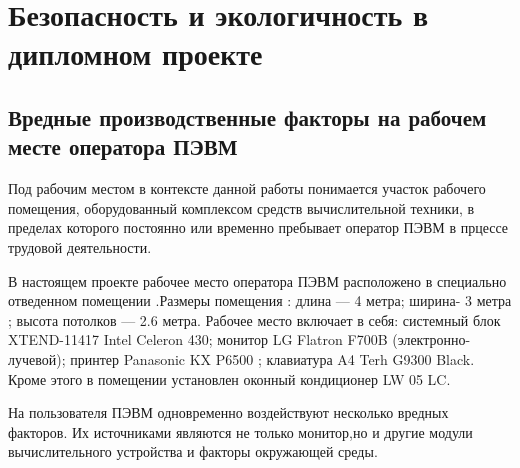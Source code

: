 \section{Безопасность и экологичность в дипломном проекте}

\subsection{Вредные производственные факторы на рабочем месте оператора ПЭВМ}
Под рабочим местом в контексте данной работы понимается участок рабочего
помещения, оборудованный комплексом средств вычислительной техники, в
пределах которого постоянно или временно пребывает оператор ПЭВМ в прцессе трудовой деятельности.


В настоящем проекте рабочее место оператора ПЭВМ расположено в 
специально отведенном помещении .Размеры помещения : длина — 4 метра;
ширина- 3 метра ; высота потолков — 2.6 метра. Рабочее место включает в себя:
системный блок XTEND-11417 Intel Celeron 430;  монитор LG Flatron F700B
(электронно-лучевой);  принтер  Panasonic KX P6500 ; клавиатура A4 Terh 
G9300 Black. Кроме этого в помещении установлен оконный кондиционер
LW 05 LC.

На пользователя ПЭВМ одновременно воздействуют несколько вредных факторов.
Их источниками являются не только монитор,но и другие модули вычислительного устройства
и факторы окружающей среды. 


